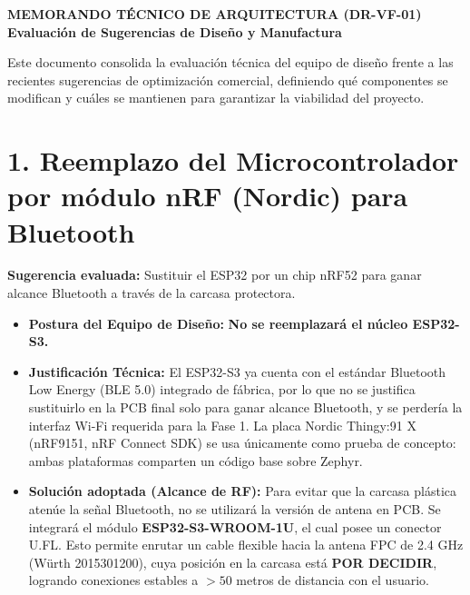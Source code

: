 \documentclass[10pt,letterpaper]{article}
\begin{document}
\begin{center}
    {\Large \textbf{MEMORANDO TÉCNICO DE ARQUITECTURA (DR-VF-01)}}\\[0.2cm]
    {\normalsize \textbf{Evaluación de Sugerencias de Diseño y Manufactura}}
\end{center}
\vspace{0.3cm}

Este documento consolida la evaluación técnica del equipo de diseño frente a las recientes sugerencias de optimización comercial, definiendo qué componentes se modifican y cuáles se mantienen para garantizar la viabilidad del proyecto.

\section*{1. Reemplazo del Microcontrolador por módulo nRF (Nordic) para Bluetooth}
\textbf{Sugerencia evaluada:} Sustituir el ESP32 por un chip nRF52 para ganar alcance Bluetooth a través de la carcasa protectora.
\begin{itemize}[leftmargin=*]
    \item \textbf{Postura del Equipo de Diseño:} \textbf{No se reemplazará el núcleo ESP32-S3.}
    \item \textbf{Justificación Técnica:} El ESP32-S3 ya cuenta con el estándar Bluetooth Low Energy (BLE 5.0) integrado de fábrica, por lo que no se justifica sustituirlo en la PCB final solo para ganar alcance Bluetooth, y se perdería la interfaz Wi-Fi requerida para la Fase 1. La placa Nordic Thingy:91 X (nRF9151, nRF Connect SDK) se usa únicamente como prueba de concepto: ambas plataformas comparten un código base sobre Zephyr. 
    \item \textbf{Solución adoptada (Alcance de RF):} Para evitar que la carcasa plástica atenúe la señal Bluetooth, no se utilizará la versión de antena en PCB. Se integrará el módulo \textbf{ESP32-S3-WROOM-1U}, el cual posee un conector U.FL. Esto permite enrutar un cable flexible hacia la antena FPC de 2.4 GHz (Würth 2015301200), cuya posición en la carcasa está \textbf{POR DECIDIR}, logrando conexiones estables a $>50$ metros de distancia con el usuario.
\end{itemize}
\end{document}
